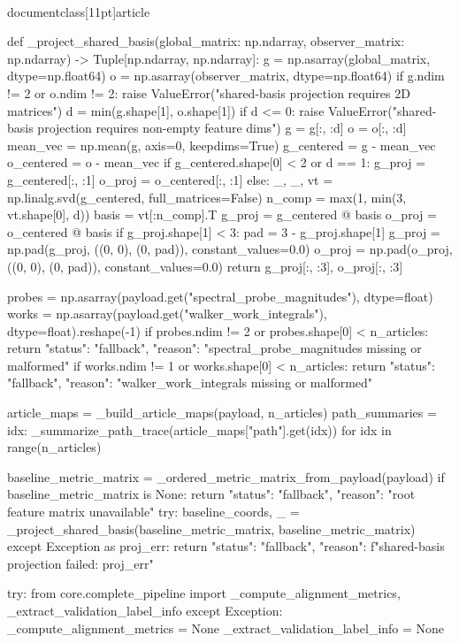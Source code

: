 \\documentclass[11pt]{article}
\begin{document}
\begin{CodeBlock}
    def _project_shared_basis(global_matrix: np.ndarray, observer_matrix: np.ndarray) -> Tuple[np.ndarray, np.ndarray]:
        g = np.asarray(global_matrix, dtype=np.float64)
        o = np.asarray(observer_matrix, dtype=np.float64)
        if g.ndim != 2 or o.ndim != 2:
            raise ValueError("shared-basis projection requires 2D matrices")
        d = min(g.shape[1], o.shape[1])
        if d <= 0:
            raise ValueError("shared-basis projection requires non-empty feature dims")
        g = g[:, :d]
        o = o[:, :d]
        mean_vec = np.mean(g, axis=0, keepdims=True)
        g_centered = g - mean_vec
        o_centered = o - mean_vec
        if g_centered.shape[0] < 2 or d == 1:
            g_proj = g_centered[:, :1]
            o_proj = o_centered[:, :1]
        else:
            _, _, vt = np.linalg.svd(g_centered, full_matrices=False)
            n_comp = max(1, min(3, vt.shape[0], d))
            basis = vt[:n_comp].T
            g_proj = g_centered @ basis
            o_proj = o_centered @ basis
        if g_proj.shape[1] < 3:
            pad = 3 - g_proj.shape[1]
            g_proj = np.pad(g_proj, ((0, 0), (0, pad)), constant_values=0.0)
            o_proj = np.pad(o_proj, ((0, 0), (0, pad)), constant_values=0.0)
        return g_proj[:, :3], o_proj[:, :3]

    probes = np.asarray(payload.get("spectral_probe_magnitudes"), dtype=float)
    works = np.asarray(payload.get("walker_work_integrals"), dtype=float).reshape(-1)
    if probes.ndim != 2 or probes.shape[0] < n_articles:
        return {"status": "fallback", "reason": "spectral_probe_magnitudes missing or malformed"}
    if works.ndim != 1 or works.shape[0] < n_articles:
        return {"status": "fallback", "reason": "walker_work_integrals missing or malformed"}

    article_maps = _build_article_maps(payload, n_articles)
    path_summaries = {
        idx: _summarize_path_trace(article_maps["path"].get(idx))
        for idx in range(n_articles)
    }

    baseline_metric_matrix = _ordered_metric_matrix_from_payload(payload)
    if baseline_metric_matrix is None:
        return {"status": "fallback", "reason": "root feature matrix unavailable"}
    try:
        baseline_coords, _ = _project_shared_basis(baseline_metric_matrix, baseline_metric_matrix)
    except Exception as proj_err:
        return {"status": "fallback", "reason": f"shared-basis projection failed: {proj_err}"}

    try:
        from core.complete_pipeline import _compute_alignment_metrics, _extract_validation_label_info
    except Exception:
        _compute_alignment_metrics = None
        _extract_validation_label_info = None


\end{CodeBlock}
\end{document}

